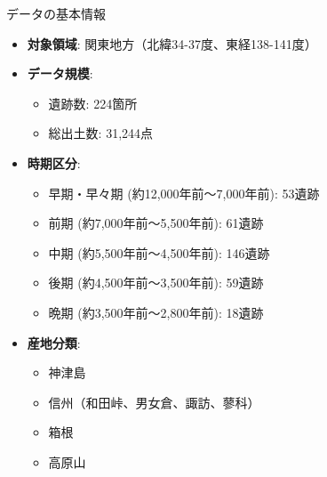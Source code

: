 \documentclass[xelatex, 8pt]{beamer}
\theoremstyle{plain}
\theoremstyle{definition}
\begin{document}
\begin{frame}{データの基本情報}
    \begin{itemize}
        \item \textbf{対象領域}: 関東地方（北緯34-37度、東経138-141度）
        \item \textbf{データ規模}:
        \begin{itemize}
            \item 遺跡数: 224箇所
            \item 総出土数: 31,244点
        \end{itemize}
        \vspace{2mm}
        \item \textbf{時期区分}:
        \begin{itemize}
            \item 早期・早々期 (約12,000年前〜7,000年前): 53遺跡
            \item 前期 (約7,000年前〜5,500年前): 61遺跡
            \item 中期 (約5,500年前〜4,500年前): 146遺跡
            \item 後期 (約4,500年前〜3,500年前): 59遺跡
            \item 晩期 (約3,500年前〜2,800年前): 18遺跡
        \end{itemize}
        \vspace{2mm}
        \item \textbf{産地分類}:
        \begin{itemize}
            \item 神津島
            \item 信州（和田峠、男女倉、諏訪、蓼科）
            \item 箱根
            \item 高原山
        \end{itemize}
    \end{itemize}
\end{frame}
\end{document}
